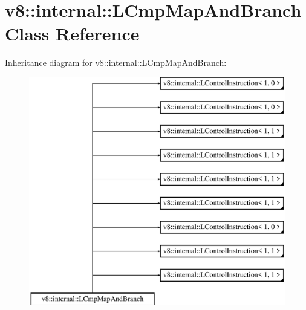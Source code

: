 \hypertarget{classv8_1_1internal_1_1_l_cmp_map_and_branch}{}\section{v8\+:\+:internal\+:\+:L\+Cmp\+Map\+And\+Branch Class Reference}
\label{classv8_1_1internal_1_1_l_cmp_map_and_branch}
Inheritance diagram for v8\+:\+:internal\+:\+:L\+Cmp\+Map\+And\+Branch\+:\begin{figure}[H]
\begin{center}
\leavevmode
\includegraphics[height=10.000000cm]{classv8_1_1internal_1_1_l_cmp_map_and_branch}
\end{center}
\end{figure}
